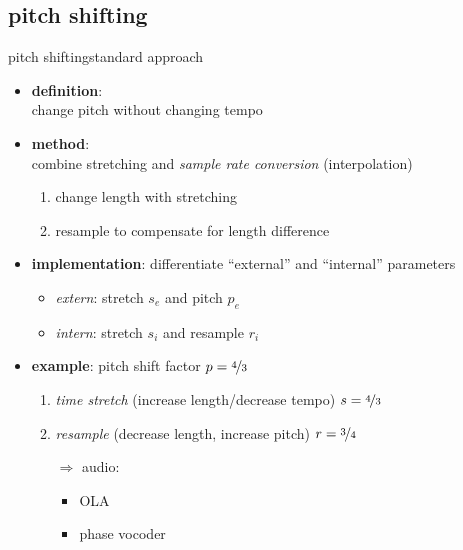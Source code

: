 \subsection{pitch shifting}
        \begin{frame}{pitch shifting}{standard approach}
            \begin{itemize}
                \item   \textbf{definition}:\\ change pitch without changing tempo
                \pause
                \item   \textbf{method}:\\ combine stretching and \textit{sample rate conversion} (interpolation)
                    \begin{enumerate}
                        \item   change length with stretching
                        \item   resample to compensate for length difference
                    \end{enumerate}
                \item<2->	\textbf{implementation}: differentiate ``external'' and ``internal'' parameters 
                        \begin{itemize}
                            \item	\textit{extern}: stretch $s_e$ and pitch $p_e$
                            \item	\textit{intern}: stretch $s_i$ and resample $r_i$
                        \end{itemize}
                
                \item<3-> \textbf{example}: pitch shift factor \textbf{$p = \nicefrac{4}{3}$}
					\begin{enumerate}
						\item	\textit{time stretch} (increase length/decrease tempo) $s = \nicefrac{4}{3}$
						\pause
						\item	\textit{resample} (decrease length, increase pitch) $r = \nicefrac{3}{4}$
                        \pause
                        \item[$\Rightarrow$]   audio:
                            \begin{itemize}
                                \item   OLA 
                                \item   phase vocoder 
                            \end{itemize}
					\end{enumerate}
            \end{itemize}
        \end{frame}
